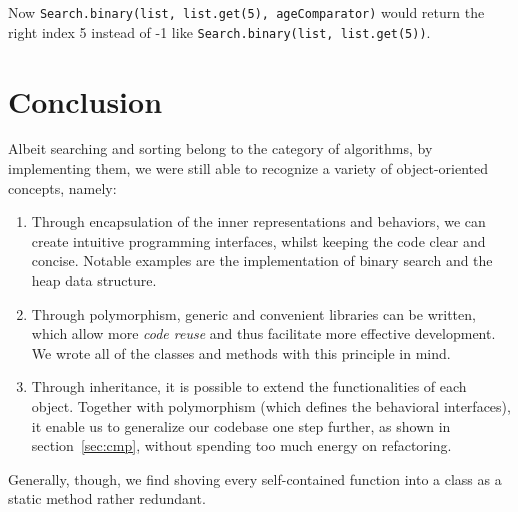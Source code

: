 \documentclass[a4paper,12pt]{article}
\begin{document}
Now \verb|Search.binary(list, list.get(5), ageComparator)| would return
the right index 5 instead of -1 like \verb|Search.binary(list, list.get(5))|.
\pagebreak

\section{Conclusion}
Albeit searching and sorting belong to the category of algorithms,
by implementing them, we were still able to recognize a variety of
object-oriented concepts, namely:
\begin{enumerate}
  \item Through encapsulation of the inner representations
    and behaviors, we can create intuitive programming interfaces,
    whilst keeping the code clear and concise.  Notable examples are
    the implementation of binary search and the heap data structure.
  \item Through polymorphism, generic and convenient libraries can be written,
    which allow more \emph{code reuse} and thus facilitate more effective
    development.  We wrote all of the classes and methods with this principle
    in mind.
  \item Through inheritance, it is possible to extend the functionalities of
    each object.  Together with polymorphism (which defines the behavioral
    interfaces), it enable us to generalize our codebase one step further,
    as shown in section~\ref{sec:cmp}, without spending too much energy
    on refactoring.
\end{enumerate}

Generally, though, we find shoving every self-contained function into a class
as a static method rather redundant.
\pagebreak
\end{document}

